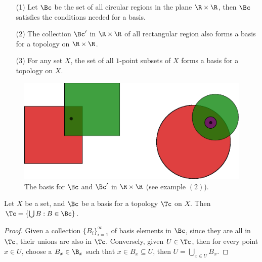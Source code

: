 \begin{example}
    \begin{enumerate}
        \item[(1)] Let $\Bc$ be the set of all circular regions in the plane  $\R \times \R$, then
            $\Bc$ satisfies the conditions needed for a basis.

        \item[(2)] The collection  $\Bc'$ in  $\R \times \R$ of all rectangular region also
            forms a basis for a topology on  $\R \times \R$.

        \item[(3)] For any set  $X$, the set of all  $1$-point subsets of  $X$ forms a
            basis for a topology on  $X$.
    \end{enumerate}
\end{example}

\begin{figure}[h]
    \centering
    \includegraphics[scale = 0.5]{Figures/chapter1/topology_basis.eps}
    \caption{The basis for $\Bc$ and  $\Bc'$ in  $\R \times \R$  (see example $(2)$).}
    \label{fig_1.2}
\end{figure}

\begin{lemma}\label{1.2.2}
    Let $X$ be a set, and  $\Bc$ be a basis for a topology  $\Tc$ on  $X$. Then
    $\Tc=\{\bigcup{B}: B \in \Bc\}$.
\end{lemma}
\begin{proof}
    Given a collection $\{B_i\}_{i=1}^{\infty}$ of basis elements in  $\Bc$, since they
    are all in  $\Tc$, their unions are also in $\Tc$. Conversely, given  $U \in \Tc$,
    then for every point $x \in U$, choose a  $B_x \in \B_x$ such that  $x \in B_x
    \subseteq U$, then  $U=\bigcup_{x \in U}{B_x}$.
\end{proof}

